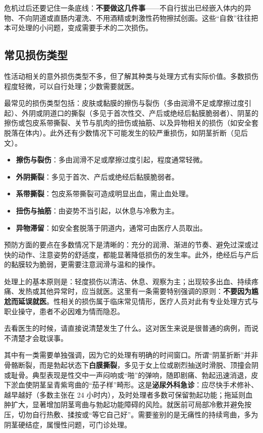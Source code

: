 \documentclass[12pt,UTF8]{ctexbook}
\newcommand{\keyword}[1]{\textbf{#1}}
\begin{document}
危机过后还要记住一条底线：\keyword{不要做这几件事}——不自行拔出已经嵌入体内的异物、不向阴道或直肠内灌洗、不用酒精或刺激性药物擦拭创面。这些“自救”往往把本可处理的小问题，变成需要手术的二次损伤。

\subsection{常见损伤类型}

性活动相关的意外损伤类型不多，但了解其种类与处理方式有实际价值。多数损伤程度轻微，可以自行处理；少数需要就医。

最常见的损伤类型包括：皮肤或黏膜的擦伤与裂伤（多由润滑不足或摩擦过度引起）、外阴或阴道口的撕裂（多见于首次性交、产后或绝经后黏膜脆弱者）、阴茎的擦伤或包皮系带撕裂、关节与肌肉的扭伤或抽筋、以及异物相关的损伤（如安全套脱落在体内）。此外还有少数情况下可能发生的较严重损伤，如阴茎折断（见后文）。

\begin{itemize}
  \item \keyword{擦伤与裂伤}：多由润滑不足或摩擦过度引起，程度通常轻微。
  \item \keyword{外阴撕裂}：多见于首次、产后或绝经后黏膜脆弱者。
  \item \keyword{系带撕裂}：包皮系带撕裂可造成明显出血，需止血处理。
  \item \keyword{扭伤与抽筋}：由姿势不当引起，以休息与冷敷为主。
  \item \keyword{异物滞留}：如安全套脱落于阴道内，通常可由医疗人员取出。
\end{itemize}

预防方面的要点在多数情况下是清晰的：充分的润滑、渐进的节奏、避免过深或过快的动作、注意姿势的舒适度，都能显著降低损伤的发生率。此外，绝经后与产后的黏膜较为脆弱，更需要注意润滑与温和的操作。

处理上的基本原则是：轻度损伤以清洁、休息、观察为主；出现较多出血、持续疼痛、发热或其他异常时，应当就医。这里有一条需要特别强调的原则：\keyword{不要因为尴尬而延误就医}。性相关的损伤属于临床常见情形，医疗人员对此有专业处理方式与职业操守，患者不必因难为情而隐忍。

\begin{tcolorbox}[colback=pink!5!white,colframe=red!50!black,title=贴心小叮咛]
去看医生的时候，请直接说清楚发生了什么。这对医生来说是很普通的病例，而说不清楚才会耽误事。
\end{tcolorbox}

其中有一类需要单独强调，因为它的处理有明确的时间窗口。所谓“阴茎折断”并非骨骼断裂，而是勃起状态下\keyword{白膜撕裂}，多见于女上位或剧烈抽送时滑脱、顶撞会阴或耻骨。典型表现是性交中一声闷响或“啪”的弹响，随即剧痛、勃起迅速消退，皮下淤血使阴茎呈青紫弯曲的“茄子样”畸形。这是\keyword{泌尿外科急诊}：应尽快手术修补、越早越好（多数主张在 24 小时内），及时处理者多数可保留勃起功能；拖延则血肿扩大，显著增加阴茎弯曲与勃起功能障碍的风险。就医前可局部冷敷并避免按压，切勿自行热敷、揉按或“等它自己好”。需要鉴别的是无痛性的持续弯曲，多为阴茎硬结症，属慢性问题，可门诊处理。
\end{document}
